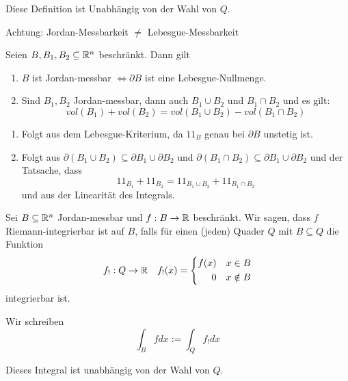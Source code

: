 \documentclass[main.tex]{subfiles}
\begin{document}
\begin{Bemerkung}
  Diese Definition ist Unabhängig von der Wahl von $Q$.
\end{Bemerkung}

\begin{Bemerkung}
  Achtung: Jordan-Messbarkeit $\neq$ Lebesgue-Messbarkeit
\end{Bemerkung}

\begin{Korollar}
  Seien $B, B_1, B_2 \subseteq \mathbb{R}^n$ beschränkt. Dann gilt
  \begin{enumerate}
    \item $B$ ist Jordan-messbar $\Leftrightarrow \partial B$ ist eine Lebesgue-Nullmenge.
    \item Sind $B_1,B_2$ Jordan-messbar, dann auch $B_1 \cup B_2$ und $B_1 \cap B_2$ und es gilt:
    \[vol(B_1) + vol(B_2) = vol(B_1 \cup B_2) - vol(B_1 \cap B_2)\]
  \end{enumerate}
\end{Korollar}

\begin{Beweis}
  \begin{enumerate}
    \item Folgt aus dem Lebesgue-Kriterium, da $1\!\!1_B$ genau bei $\partial B$ unstetig ist.
    \item Folgt aus $\partial(B_1 \cup B_2) \subseteq \partial B_1 \cup \partial B_2$ und $\partial(B_1 \cap B_2) \subseteq \partial B_1 \cup \partial B_2$ und der Tatsache, dass
    $$1\!\!1_{B_1} + 1\!\!1_{B_2} = 1\!\!1_{B_1 \cup B_2} + 1\!\!1_{B_1 \cap B_2}$$
    und aus der Linearität des Integrals.
  \end{enumerate}
\end{Beweis}

\begin{Definition}
  Sei $B \subseteq \mathbb{R}^n$ Jordan-messbar und $f: B \to \mathbb{R}$ beschränkt. Wir sagen, dass $f$ Riemann-integrierbar ist auf $B$, falls für einen (jeden) Quader $Q$ mit $B \subseteq Q$ die Funktion
  $$f_!: Q \to \mathbb{R} \quad f_!(x) = \left\{\begin{aligned}
    f(x) & & x \in B \\ 0 & & x \notin B
  \end{aligned}\right.$$
  integrierbar ist.

  Wir schreiben
  $$\int_B f dx := \int_Q f_! dx$$
\end{Definition}

\begin{Bemerkung}
  Dieses Integral ist unabhängig von der Wahl von $Q$.
\end{Bemerkung}
\end{document}
